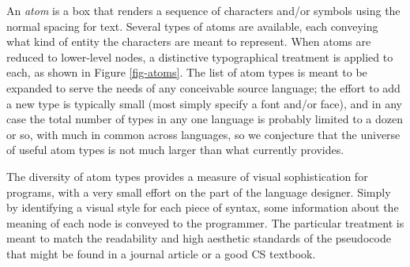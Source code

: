 An \emph{atom} is a box that renders a sequence of characters and/or symbols using the normal spacing for text. Several types of atoms are available, each conveying what kind of entity the characters are meant to represent. When atoms are reduced to lower-level nodes, a distinctive typographical treatment is applied to each, as shown in Figure \ref{fig-atoms}. The list of atom types is meant to be expanded to serve the needs of any conceivable source language; the effort to add a new type is typically small (most simply specify a font and/or face), and in any case the total number of types in any one language is probably limited to a dozen or so, with much in common across languages, so we conjecture that the universe of useful atom types is not much larger than what  currently provides. 

The diversity of atom types provides a measure of visual sophistication for programs, with a very small effort on the part of the language designer. Simply by identifying a visual style for each piece of syntax, some information about the meaning of each node is conveyed to the programmer. The particular treatment is meant to match the readability and high aesthetic standards of the pseudocode that might be found in a journal article or a good CS textbook.

